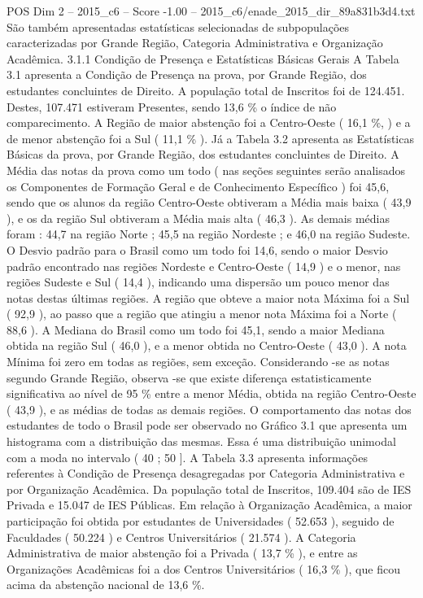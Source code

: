\begin{textsample}{POS Dim 2 – 2015\_c6 – Score -1.00 – 2015\_c6/enade\_2015\_dir\_89a831b3d4.txt}
São também apresentadas estatísticas selecionadas de subpopulações caracterizadas por Grande Região, Categoria Administrativa e Organização Acadêmica. 3.1.1 Condição de Presença e Estatísticas Básicas Gerais A Tabela 3.1 apresenta a Condição de Presença na prova, por Grande Região, dos estudantes concluintes de Direito.
A população total de Inscritos foi de 124.451.
Destes, 107.471 estiveram Presentes, sendo 13,6 \% o índice de não comparecimento.
A Região de maior abstenção foi a Centro-Oeste ( 16,1 \%, ) e a de menor abstenção foi a Sul ( 11,1 \% ).
Já a Tabela 3.2 apresenta as Estatísticas Básicas da prova, por Grande Região, dos estudantes concluintes de Direito.
A Média das notas da prova como um todo ( nas seções seguintes serão analisados os Componentes de Formação Geral e de Conhecimento Específico ) foi 45,6, sendo que os alunos da região Centro-Oeste obtiveram a Média mais baixa ( 43,9 ), e os da região Sul obtiveram a Média mais alta ( 46,3 ).
As demais médias foram : 44,7 na região Norte ; 45,5 na região Nordeste ; e 46,0 na região Sudeste.
O Desvio padrão para o Brasil como um todo foi 14,6, sendo o maior Desvio padrão encontrado nas regiões Nordeste e Centro-Oeste ( 14,9 ) e o menor, nas regiões Sudeste e Sul ( 14,4 ), indicando uma dispersão um pouco menor das notas destas últimas regiões.
A região que obteve a maior nota Máxima foi a Sul ( 92,9 ), ao passo que a região que atingiu a menor nota Máxima foi a Norte ( 88,6 ).
A Mediana do Brasil como um todo foi 45,1, sendo a maior Mediana obtida na região Sul ( 46,0 ), e a menor obtida no Centro-Oeste ( 43,0 ).
A nota Mínima foi zero em todas as regiões, sem exceção.
Considerando -se as notas segundo Grande Região, observa -se que existe diferença estatisticamente significativa ao nível de 95 \% entre a menor Média, obtida na região Centro-Oeste ( 43,9 ), e as médias de todas as demais regiões.
O comportamento das notas dos estudantes de todo o Brasil pode ser observado no Gráfico 3.1 que apresenta um histograma com a distribuição das mesmas.
Essa é uma distribuição unimodal com a moda no intervalo ( 40 ; 50 ].
A Tabela 3.3 apresenta informações referentes à Condição de Presença desagregadas por Categoria Administrativa e por Organização Acadêmica.
Da população total de Inscritos, 109.404 são de IES Privada e 15.047 de IES Públicas.
Em relação à Organização Acadêmica, a maior participação foi obtida por estudantes de Universidades ( 52.653 ), seguido de Faculdades ( 50.224 ) e Centros Universitários ( 21.574 ).
A Categoria Administrativa de maior abstenção foi a Privada ( 13,7 \% ), e entre as Organizações Acadêmicas foi a dos Centros Universitários ( 16,3 \% ), que ficou acima da abstenção nacional de 13,6 \%.

\end{textsample}
